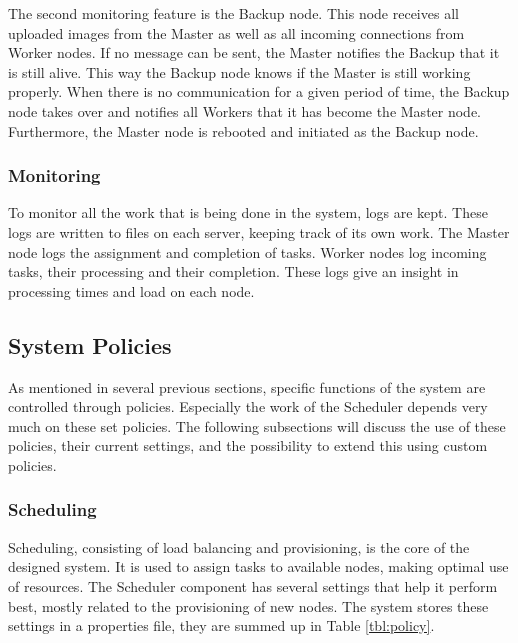 \documentclass{acm_proc_article-sp}
\begin{document}
The second monitoring feature is the Backup node.
This node receives all uploaded images from the Master as well as all incoming connections from Worker nodes.
If no message can be sent, the Master notifies the Backup that it is still alive.
This way the Backup node knows if the Master is still working properly.
When there is no communication for a given period of time, the Backup node takes over and notifies all Workers that it has become the Master node.
Furthermore, the Master node is rebooted and initiated as the Backup node.

\subsubsection{Monitoring}
To monitor all the work that is being done in the system, logs are kept.
These logs are written to files on each server, keeping track of its own work.
The Master node logs the assignment and completion of tasks.
Worker nodes log incoming tasks, their processing and their completion.
These logs give an insight in processing times and load on each node.

\subsection{System Policies}
\label{sec:policies}
As mentioned in several previous sections, specific functions of the system are controlled through policies.
Especially the work of the Scheduler depends very much on these set policies.
The following subsections will discuss the use of these policies, their current settings, and the possibility to extend this using custom policies.

\subsubsection{Scheduling}
Scheduling, consisting of load balancing and provisioning, is the core of the designed system.
It is used to assign tasks to available nodes, making optimal use of resources.
The Scheduler component has several settings that help it perform best, mostly related to the provisioning of new nodes.
The system stores these settings in a properties file, they are summed up in Table \ref{tbl:policy}.
\end{document}
